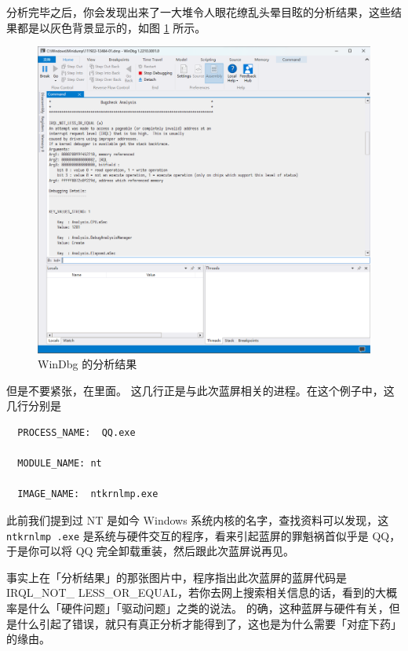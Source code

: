 分析完毕之后，你会发现出来了一大堆令人眼花缭乱头晕目眩的分析结果，这些结果都是以灰色背景显示的，如图 \ref{WinDbg-3} 所示。

\begin{figure}[htb!]
  \centering
  \includegraphics[width=13cm]{assets/WinDbg-3.png}
  \caption{WinDbg 的分析结果}
  \label{WinDbg-3}
\end{figure}

但是不要紧张，在里面。
这几行正是与此次蓝屏相关的进程。在这个例子中，这几行分别是

\begin{Verbatim}
  PROCESS_NAME:  QQ.exe
  
  MODULE_NAME: nt
  
  IMAGE_NAME:  ntkrnlmp.exe
\end{Verbatim}

此前我们提到过 NT 是如今 Windows 系统内核的名字，查找资料可以发现，这 \texttt{ntkrnlmp .exe} 是系统与硬件交互的程序，看来引起蓝屏的罪魁祸首似乎是 QQ，于是你可以将 QQ 完全卸载重装，然后跟此次蓝屏说再见。

事实上在「分析结果」的那张图片中，程序指出此次蓝屏的蓝屏代码是 IRQL\_{}NOT\_{} LESS\_{}OR\_{}EQUAL，若你去网上搜索相关信息的话，看到的大概率是什么「硬件问题」「驱动问题」之类的说法。
的确，这种蓝屏与硬件有关，但是什么引起了错误，就只有真正分析才能得到了，这也是为什么需要「对症下药」的缘由。

